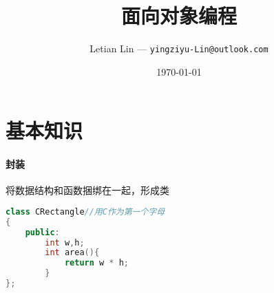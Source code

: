 \documentclass[UTF8]{ctexart}
\title{
	面向对象编程
}
\author{
	Letian Lin --- \texttt{yingziyu-Lin@outlook.com}
}
\date{\today}
\begin{document}
\maketitle
\section{基本知识}


\paragraph{封装}将数据结构和函数捆绑在一起，形成类



\begin{lstlisting}[language=C++]
class CRectangle//用C作为第一个字母
{
	public:
		int w,h;
		int area(){
			return w * h;
		}
};
\end{lstlisting}
\end{document}
